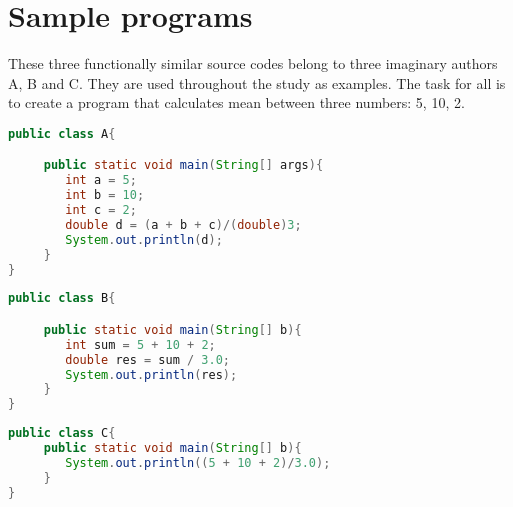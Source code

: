\documentclass[english, grading]{tktltiki2}
\theoremstyle{definition}
\theoremstyle{remark}
\numberwithin{equation}{section} %
\begin{document}
%

%
%
%
%
\newpage






\newpage
\appendix
% 



\section{Sample programs} \label{appendix:programs}

These three functionally similar source codes belong to three imaginary authors A, B and C. They are used throughout the study as examples. The task for all is to create a program that calculates mean between three numbers: 5, 10, 2.

\begin{lstlisting}[language=Java, caption=Java example belonging to author A]
public class A{

     public static void main(String[] args){
        int a = 5;
        int b = 10;
        int c = 2;
        double d = (a + b + c)/(double)3;
        System.out.println(d);
     }
}
\end{lstlisting}

\begin{lstlisting}[language=Java, caption=Java example belonging to author B]
public class B{

     public static void main(String[] b){
        int sum = 5 + 10 + 2;
        double res = sum / 3.0;
        System.out.println(res);
     }
}
\end{lstlisting}

\begin{lstlisting}[language=Java, caption=Java example belonging to author C]
public class C{
     public static void main(String[] b){
        System.out.println((5 + 10 + 2)/3.0);
     }
}
\end{lstlisting}
\end{document}
